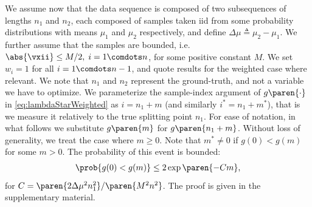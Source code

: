 We assume now that the data sequence is composed of two subsequences
of lengths $n_1$ and $n_2$, each composed of samples taken iid
from some probability distributions with means $\mu_1$
and $\mu_2$ respectively, and define $\Delta\mu\triangleq\mu_2-\mu_1$. We further
assume that the samples are bounded, i.e. $\abs{\vxii}\leq M/2,\;i=1\comdots n$,
for some positive constant $M$.
We set $w_i=1$ for all $i=1\comdots n-1$, and quote results for the weighted case where relevant. We note that $n_1$ and $n_2$ represent the
ground-truth, and not a variable we have to optimize.
We parameterize the sample-index argument of $g\paren{\cdot}$ in \eqref{eq:lambdaStarWeighted} as $i=n_1+m$ (and similarly $i^*=n_1+m^*$), that is we measure it
relatively to the true
splitting point $n_1$. For ease of notation, in what follows we substitute $g\paren{m}$ for $g\paren{n_1+m}$.
Without loss of generality, we treat the case where
$m\geq0$. Note that $m^*\neq0$ if $g(0)<g(m)$ for some $m>0$.
The probability of this event is bounded:
\begin{align}\label{eq:1D_errBound_m}
    \prob{g(0)<g(m)} %
    \leq 2\exp\paren{-Cm},%
\end{align}
for $C=\paren{2\Delta\mu^2n_1^2}/\paren{M^2n^2}$.
The proof is given in %
the supplementary material.

